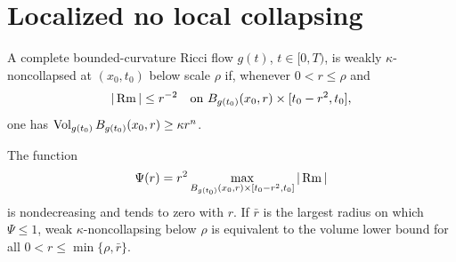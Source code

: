 \section{Localized no local collapsing}

\begin{definition}
\label{def:chow-iii-weakly-kappa-noncollapsed}

A complete bounded-curvature Ricci flow \(g(t)\), \(t\in[0,T)\), is weakly
\(\kappa\)-noncollapsed at \((x_0,t_0)\) below scale \(\rho\) if, whenever
\(0<r\le\rho\) and
\[
 |\operatorname{Rm}|\le r^{-2}\quad\text{on }B_{g(t_0)}(x_0,r)\times[t_0-r^2,t_0],
\]
one has \(\operatorname{Vol}_{g(t_0)}B_{g(t_0)}(x_0,r)\ge\kappa r^n\).
\end{definition}

\begin{remark}
\label{rem:chow-iii-largest-curvature-controlled-scale}


The function
\[
 \Psi(r)=r^2\max_{B_{g(t_0)}(x_0,r)\times[t_0-r^2,t_0]}|\operatorname{Rm}|
\]
is nondecreasing and tends to zero with \(r\).  If \(\bar r\) is the largest
radius on which \(\Psi\le1\), weak \(\kappa\)-noncollapsing below \(\rho\) is
equivalent to the volume lower bound for all
\(0<r\le\min\{\rho,\bar r\}\).
\end{remark}

